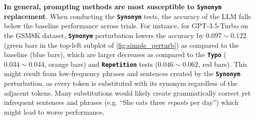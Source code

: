\documentclass[11pt]{article}
\begin{document}
\noindent\textbf{In general, prompting methods are most susceptible to \texttt{Synonym} replacement}. When conducting the \textbf{\texttt{Synonym}} tests, the accuracy of the LLM falls below the baseline performance across trials. For instance, for GPT-3.5-Turbo on the GSM8K dataset, \textbf{\texttt{Synonym}} perturbation lowers the accuracy by $0.097 \sim 0.122$ (green bars in the top-left subplot of \autoref{fig:simple_perturb}) as compared to the baseline (blue bars), which are larger decreases as compared to the \textbf{\texttt{Typo}} ($0.034 \sim 0.044$, orange bars) and \textbf{\texttt{Repetition}} tests ($0.046 \sim 0.062$, red bars). This might result from low-frequency phrases and sentences created by the \textbf{\texttt{Synonym}} perturbation, as every token is substituted with its synonym regardless of the adjacent tokens. Many substitutions would likely create grammatically correct yet infrequent sentences and phrases (e.g. ``She eats three \textit{repasts} per day'') which might lead to worse performance.



\end{document}
